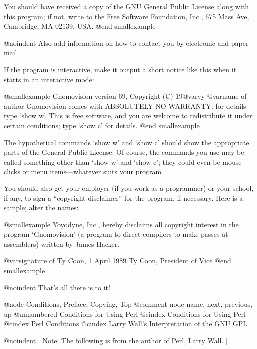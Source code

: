 You should have received a copy of the GNU General Public License
along with this program; if not, write to the Free Software
Foundation, Inc., 675 Mass Ave, Cambridge, MA 02139, USA.
@end smallexample

@noindent
Also add information on how to contact you by electronic and paper mail.

If the program is interactive, make it output a short notice like this
when it starts in an interactive mode:

@smallexample
Gnomovision version 69, Copyright (C) 19@var{yy} @var{name of author}
Gnomovision comes with ABSOLUTELY NO WARRANTY; for details type `show w'.
This is free software, and you are welcome to redistribute it
under certain conditions; type `show c' for details.
@end smallexample

The hypothetical commands `show w' and `show c' should show the
appropriate parts of the General Public License.  Of course, the
commands you use may be called something other than `show w' and `show
c'; they could even be mouse-clicks or menu items---whatever suits your
program.

You should also get your employer (if you work as a programmer) or your
school, if any, to sign a ``copyright disclaimer'' for the program, if
necessary.  Here is a sample; alter the names:

@smallexample
Yoyodyne, Inc., hereby disclaims all copyright interest in the program
`Gnomovision' (a program to direct compilers to make passes at
assemblers) written by James Hacker.

@var{signature of Ty Coon}, 1 April 1989
Ty Coon, President of Vice
@end smallexample

@noindent
That's all there is to it!

@node     Conditions, Preface, Copying, Top
@comment  node-name,  next,  previous,  up
@unnumbered Conditions for Using Perl
@cindex Conditions for Using Perl
@cindex Perl Conditions
@cindex Larry Wall's Interpretation of the GNU GPL

@noindent
[ Note: The following is from the author of Perl, Larry Wall. ]

